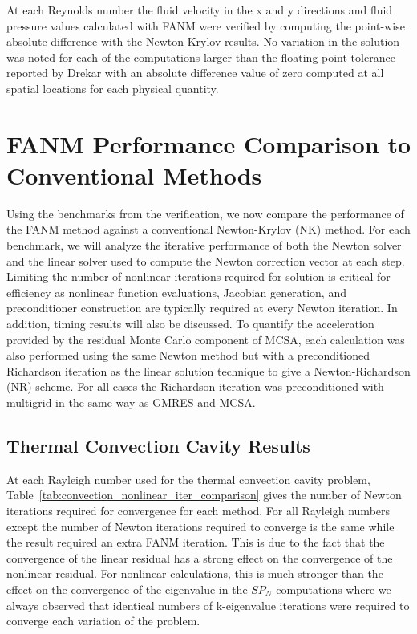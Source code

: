 At each Reynolds number the fluid velocity in the x and y directions
and fluid pressure values calculated with FANM were verified by
computing the point-wise absolute difference with the Newton-Krylov
results. No variation in the solution was noted for each of the
computations larger than the floating point tolerance reported by
Drekar with an absolute difference value of zero computed at all
spatial locations for each physical quantity.

\section{FANM Performance Comparison to Conventional Methods\ }
\label{sec:fanm_comparison}

Using the benchmarks from the verification, we now compare the
performance of the FANM method against a conventional Newton-Krylov
(NK) method. For each benchmark, we will analyze the iterative
performance of both the Newton solver and the linear solver used to
compute the Newton correction vector at each step. Limiting the number
of nonlinear iterations required for solution is critical for
efficiency as nonlinear function evaluations, Jacobian generation, and
preconditioner construction are typically required at every Newton
iteration. In addition, timing results will also be discussed. To
quantify the acceleration provided by the residual Monte Carlo
component of MCSA, each calculation was also performed using the same
Newton method but with a preconditioned Richardson iteration as the
linear solution technique to give a Newton-Richardson (NR) scheme. For
all cases the Richardson iteration was preconditioned with multigrid
in the same way as GMRES and MCSA.

\subsection{Thermal Convection Cavity Results}
\label{subsec:thermal_convection_comparison}

At each Rayleigh number used for the thermal convection cavity
problem, Table~\ref{tab:convection_nonlinear_iter_comparison} gives
the number of Newton iterations required for convergence for each
method.  For all Rayleigh numbers except  the number of
Newton iterations required to converge is the same while the 
result required an extra FANM iteration. This is due to the fact that
the convergence of the linear residual has a strong effect on the
convergence of the nonlinear residual. For nonlinear calculations,
this is much stronger than the effect on the convergence of the
eigenvalue in the $SP_N$ computations where we always observed that
identical numbers of k-eigenvalue iterations were required to converge
each variation of the problem.

